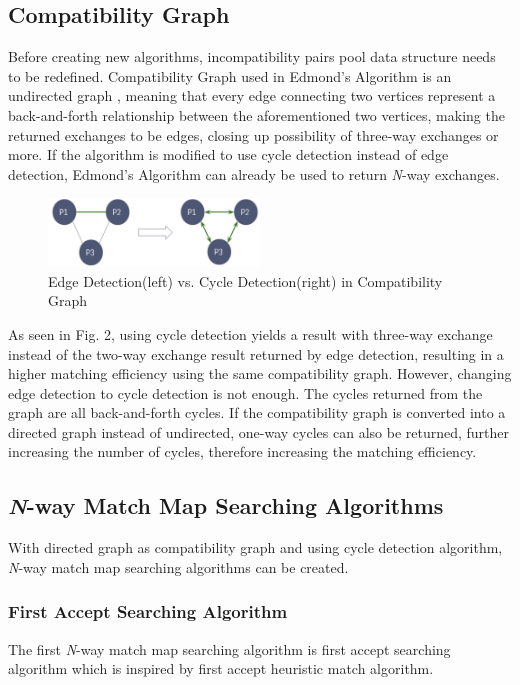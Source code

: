 \documentclass[conference]{IEEEtran}
\begin{document}
\subsection{Compatibility Graph}
Before creating new algorithms, incompatibility pairs pool data structure needs to be redefined. Compatibility Graph
used in Edmond's Algorithm is an undirected graph \cite{raja}, meaning that every edge connecting two vertices represent a back-and-forth
relationship between the aforementioned two vertices, making the returned exchanges to be edges, closing up possibility
of three-way exchanges or more. If the algorithm is modified to use cycle detection instead of edge detection, Edmond's
Algorithm can already be used to return \textit{N}-way exchanges.

\begin{figure}
\includegraphics[width=0.5\textwidth]{images/edge-vs-cycle-detection.jpg}
\caption{Edge Detection(left) vs. Cycle Detection(right) in Compatibility Graph}
\end{figure}

As seen in Fig. 2, using cycle detection yields a result with three-way exchange instead of the two-way exchange result
returned by edge detection, resulting in a higher matching efficiency using the same compatibility graph. However, changing
edge detection to cycle detection is not enough. The cycles returned from the graph are all back-and-forth cycles. If the
compatibility graph is converted into a directed graph instead of undirected, one-way cycles can also be returned, further
increasing the number of cycles, therefore increasing the matching efficiency.

\subsection{\textit{N}-way Match Map Searching Algorithms}
With directed graph as compatibility graph and using cycle detection algorithm, \textit{N}-way match map searching algorithms
can be created.

\subsubsection{First Accept Searching Algorithm}
The first \textit{N}-way match map searching algorithm is first accept searching algorithm which is inspired by first accept
heuristic match algorithm.
\end{document}
